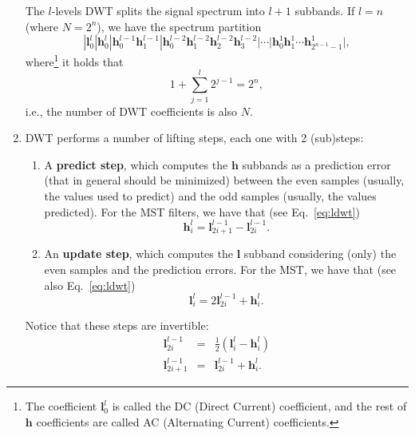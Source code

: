 \begin{enumerate}
  The $l$-levels DWT splits the signal spectrum into $l+1$ subbands. If
  $l=n$ (where $N=2^n$), we have the spectrum partition
  \begin{equation*}
        | \mathbf{l}^l_0 | \mathbf{h}^l_0 | \mathbf{h}^{l-1}_0 \mathbf{h}^{l-1}_1 | \mathbf{h}^{l-2}_0 \mathbf{h}^{l-2}_1 \mathbf{h}^{l-2}_2 \mathbf{h}^{l-2}_3 | \cdots | \mathbf{h}^1_0 \mathbf{h}^1_1 \cdots \mathbf{h}^1_{2^{n-1}-1} |,
  \end{equation*}
  where\footnote{The coefficient ${\mathbf l}^l_0$ is called the DC
    (Direct Current) coefficient, and the rest of ${\mathbf h}$
    coefficients are called AC (Alternating Current) coefficients.} it
  holds that
  \begin{equation}
    1+\sum_{j=1}^l 2^{j-1}=2^n,
  \end{equation}
  i.e., the number of DWT coefficients is also $N$.

\item DWT performs a number of lifting steps, each one with
  2 (sub)steps:
  \begin{enumerate}
  \item A \textbf{predict step}, which computes the ${\mathbf h}$
    subbands as a prediction error (that in general should be
    minimized) between the even samples (usually, the values used to
    predict) and the odd samples (usually, the values predicted). For
    the MST filters, we have that (see Eq.~\eqref{eq:ldwt})
    \begin{equation}
      {\mathbf h}^l_i = {\mathbf l}^{l-1}_{2i+1} - {\mathbf l}^{l-1}_{2i}.
    \end{equation}
    
  \item An \textbf{update step}, which computes the ${\mathbf l}$
    subband considering (only) the even samples and the prediction
    errors. For the MST, we have that (see also Eq.~\eqref{eq:ldwt})
    \begin{equation}
      {\mathbf l}^l_i = 2{\mathbf l}^{l-1}_{2i} + {\mathbf h}^l_i.
    \end{equation}
  \end{enumerate}

  Notice that these steps are invertible:
  \begin{equation}
    \begin{array}{rcl}
      {\mathbf l}^{l-1}_{2i} & = & \frac{1}{2}({\mathbf l}^l_i - {\mathbf h}^l_i)\\
      {\mathbf l}^{l-1}_{2i+1} & = & {\mathbf l}^{l-1}_{2i} + {\mathbf h}^l_i.
    \end{array}
  \end{equation}

\end{enumerate}

